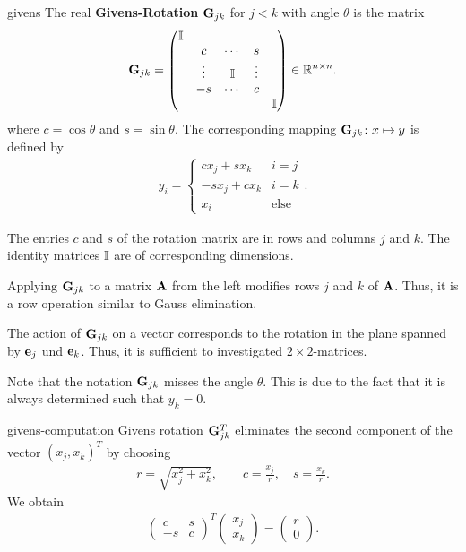\begin{Definition}{givens}
  The real \textbf{Givens-Rotation} $\mathbf G_{jk}$ for $j<k$ with angle $\theta$ is the matrix
  \begin{gather}
      \mathbf G_{jk} =
    \begin{pmatrix}
      \mathbb I \\
      &c&\cdots&s\\
      &\vdots&\mathbb I &\vdots\\
      &-s&\cdots&c\\
      &&&&\mathbb I
    \end{pmatrix}
    \in\mathbb R^{n\times n}.
  \end{gather}
    where $c = \cos\theta$ and $s = \sin\theta$.
  The corresponding mapping $\mathbf G_{jk}\colon x\mapsto y$ is defined by
  \begin{gather}
    y_i =
    \begin{cases}
      c x_j + s x_k & i=j\\
      -s x_j + c x_k & i=k\\
      x_i &\text{else}
    \end{cases}.
  \end{gather}
\end{Definition}

\begin{remark}
  The entries $c$ and $s$ of the rotation matrix are in rows and
  columns $j$ and $k$.  The identity matrices $\mathbb I$ are of
  corresponding dimensions.

  Applying $\mathbf G_{jk}$ to a matrix $\mathbf A$ from the left modifies rows  $j$ and $k$ of $\mathbf A$. Thus, it is a row operation similar to Gauss elimination.

  The action of $\mathbf G_{jk}$ on a vector corresponds to the rotation
  in the plane spanned by $\mathbf e_j$ und $\mathbf e_k$. Thus, it is sufficient to investigated $2\times2$-matrices.

  Note that the notation $\mathbf G_{jk}$ misses the angle $\theta$. This
  is due to the fact that it is always determined such that $y_k=0$.
\end{remark}

\begin{Lemma}{givens-computation}
  Givens rotation $\mathbf G_{jk}^T$ eliminates the second component of the vector
  $(x_j,x_k)^T$ by choosing
  \begin{gather}
    r = \sqrt{x_j^2+x_k^2},\qquad
    c = \frac{x_j}r,\quad s = \frac{x_k}r.
  \end{gather}
  We obtain
  \begin{gather}
    \begin{pmatrix}
      c & s \\ -s & c
    \end{pmatrix}^T
    \begin{pmatrix}
      x_j\\x_k
    \end{pmatrix}
    =
    \begin{pmatrix}
      r\\0
    \end{pmatrix}
    .
  \end{gather}
\end{Lemma}

